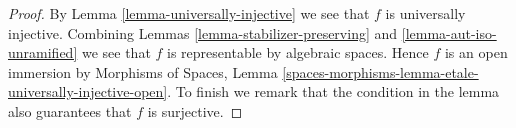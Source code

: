 \documentclass[10pt,a4paper]{amsart}
\theoremstyle{plain}
\theoremstyle{definition}
\theoremstyle{remark}
\numberwithin{equation}{subsection}
\begin{document}
\begin{proof}
By Lemma \ref{lemma-universally-injective} we see that $f$ is
universally injective. Combining
Lemmas \ref{lemma-stabilizer-preserving} and
\ref{lemma-aut-iso-unramified}
we see that $f$ is representable by algebraic spaces.
Hence $f$ is an open immersion by Morphisms of Spaces, Lemma
\ref{spaces-morphisms-lemma-etale-universally-injective-open}.
To finish we remark that the condition in the lemma also guarantees
that $f$ is surjective.
\end{proof}
\end{document}
